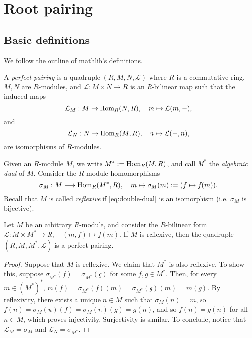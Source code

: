 \chapter{Root pairing}
\label{cha:root-pairing}
\section{Basic definitions}
\label{sec:basic-definitions}

We follow the outline of mathlib's definitions. 

\begin{definition}
   \label{def:perfect-pairing}
   \leanok
    A {\it perfect pairing} is a quadruple $(R,M,N,\mathcal{L})$ where $R$ is a commutative ring, $M,N$ are 
    $R$-modules, and $\mathcal{L} : M \times N \to R$ is an $R$-bilinear map such that the induced maps
    \[
        \mathcal{L}_M : M \to {\rm Hom}_R(N,R), \quad m \mapsto \mathcal{L}(m,-),
    \]
    and 
    \[
        \mathcal{L}_N : N \to {\rm Hom}_R(M,R), \quad n \mapsto \mathcal{L}(-,n),
    \]
    are isomorphisms of $R$-modules.
\end{definition}
Given an $R$-module $M$, we write $M^* := {\rm Hom}_R(M,R)$, and call $M^*$ the 
{\it algebraic dual} of $M$. Consider the $R$-module homomorphisms
\begin{equation}\label{eq:double-dual}
   \sigma_M: M \longrightarrow {\rm Hom}_R(M^*,R), \quad m \mapsto \sigma_M(m) := (f \mapsto f(m)).
\end{equation}
Recall that $M$ is called {\it reflexive} if \eqref{eq:double-dual} is an isomorphism 
(i.e. $\sigma_M$ is bijective). 
\begin{lemma}
    \label{lem:reflexive-perf-pairing}
    \leanok
    Let $M$ be an arbitrary $R$-module, and consider the $R$-bilinear form 
    $\mathcal{L} : M \times M^* \to R, \quad (m,f) \mapsto f(m)$. If $M$ is reflexive, then the
    quadruple $(R,M, M^*, \mathcal{L})$ is a perfect pairing.
\end{lemma}
\begin{proof}
Suppose that $M$ is reflexive. We claim that $M^*$ is also reflexive. To show this, suppose $\sigma_{M^*}(f) = \sigma_{M^*}(g)$ for some $f,g \in M^*$. Then, for every $m \in (M^*)^*$,  $m(f) = \sigma_{M^*}(f)(m) = \sigma_{M^*}(g)(m) = m(g)$. By reflexivity, there exists a unique $n \in M$ such that $\sigma_M(n) = m$, so $f(n) = \sigma_M(n)(f) = \sigma_M(n)(g) = g(n)$, and so $f(n) = g(n)$ for all $n \in M$, which proves injectivity. Surjectivity is similar. To conclude, notice that $\mathcal{L}_M = \sigma_M$ and $\mathcal{L}_{N} = \sigma_{M^*}$.
\end{proof}


